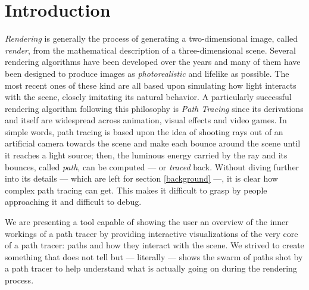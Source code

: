 \chapter{Introduction}

\textit{Rendering} is generally the process of generating a two-dimensional image, called \textit{render}, from the mathematical description of a three-dimensional scene. 
Several rendering algorithms have been developed over the years and many of them have been designed to produce images as \textit{photorealistic} and lifelike as possible. The most recent ones of these kind are all based upon simulating how light interacts with the scene, closely imitating its natural behavior. A particularly successful rendering algorithm following this philosophy is \textit{Path Tracing} \cite{kajiya1986rendering} since its derivations and itself are widespread across animation, visual effects and video games. In simple words, path tracing is based upon the idea of shooting rays out of an artificial camera towards the scene and make each bounce around the scene until it reaches a light source; then, the luminous energy carried by the ray and its bounces, called \textit{path}, can be computed --- or \textit{traced} back.  Without diving further into its details --- which are left for section \ref{background} ---, it is clear how complex path tracing can get. This makes it difficult to grasp by people approaching it and difficult to debug.

We are presenting a tool capable of showing the user an overview of the inner workings of a path tracer by providing interactive visualizations of the very core of a path tracer: paths and how they interact with the scene.
We strived to create something that does not tell but --- literally --- shows the swarm of paths shot by a path tracer to help understand what is actually going on during the rendering process.

